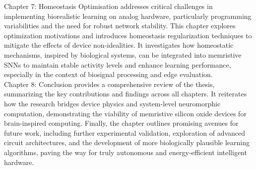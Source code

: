 \noindent Chapter 7: Homeostasis Optimisation addresses critical challenges in implementing biorealistic learning on analog hardware, particularly programming variabilities and the need for robust network stability. This chapter explores optimization motivations and introduces homeostasis regularization techniques to mitigate the effects of device non-idealities. It investigates how homeostatic mechanisms, inspired by biological systems, can be integrated into memristive SNNs to maintain stable activity levels and enhance learning performance, especially in the context of biosignal processing and edge evaluation.\\

\noindent Chapter 8: Conclusion provides a comprehensive review of the thesis, summarizing the key contributions and findings across all chapters. It reiterates how the research bridges device physics and system-level neuromorphic computation, demonstrating the viability of memristive silicon oxide devices for brain-inspired computing. Finally, the chapter outlines promising avenues for future work, including further experimental validation, exploration of advanced circuit architectures, and the development of more biologically plausible learning algorithms, paving the way for truly autonomous and energy-efficient intelligent hardware.\\